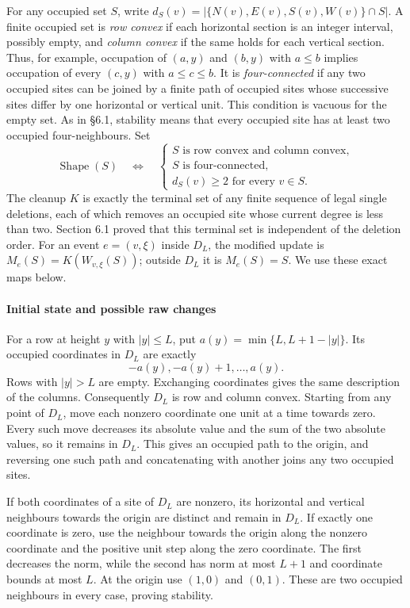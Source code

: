 \documentclass[
  11pt,
  a4paper,
]{article}
\begin{document}
For any occupied set \(S\), write
\(d_S(v)=|\{N(v),E(v),S(v),W(v)\}\cap S|\). A finite occupied set is
\emph{row convex} if each horizontal section is an integer interval,
possibly empty, and \emph{column convex} if the same holds for each
vertical section. Thus, for example, occupation of \((a,y)\) and
\((b,y)\) with \(a\le b\) implies occupation of every \((c,y)\) with
\(a\le c\le b\). It is \emph{four-connected} if any two occupied sites
can be joined by a finite path of occupied sites whose successive sites
differ by one horizontal or vertical unit. This condition is vacuous for
the empty set. As in §6.1, stability means that every occupied site has
at least two occupied four-neighbours. Set \[
\operatorname{Shape}(S)
\quad\Longleftrightarrow\quad
\left\{\begin{array}{l}
S\text{ is row convex and column convex},\\
S\text{ is four-connected},\\
d_S(v)\ge2\text{ for every }v\in S.
\end{array}\right.
\tag{G1}
\] The cleanup \(K\) is exactly the terminal set of any finite sequence
of legal single deletions, each of which removes an occupied site whose
current degree is less than two. Section 6.1 proved that this terminal
set is independent of the deletion order. For an event \(e=(v,\xi)\)
inside \(D_L\), the modified update is \(M_e(S)=K(W_{v,\xi}(S))\);
outside \(D_L\) it is \(M_e(S)=S\). We use these exact maps below.

\paragraph{Initial state and possible raw
changes}\label{initial-state-and-possible-raw-changes}

For a row at height \(y\) with \(|y|\le L\), put
\(a(y)=\min\{L,L+1-|y|\}\). Its occupied coordinates in \(D_L\) are
exactly \[
-a(y),-a(y)+1,\ldots,a(y).
\] Rows with \(|y|>L\) are empty. Exchanging coordinates gives the same
description of the columns. Consequently \(D_L\) is row and column
convex. Starting from any point of \(D_L\), move each nonzero coordinate
one unit at a time towards zero. Every such move decreases its absolute
value and the sum of the two absolute values, so it remains in \(D_L\).
This gives an occupied path to the origin, and reversing one such path
and concatenating with another joins any two occupied sites.

If both coordinates of a site of \(D_L\) are nonzero, its horizontal and
vertical neighbours towards the origin are distinct and remain in
\(D_L\). If exactly one coordinate is zero, use the neighbour towards
the origin along the nonzero coordinate and the positive unit step along
the zero coordinate. The first decreases the norm, while the second has
norm at most \(L+1\) and coordinate bounds at most \(L\). At the origin
use \((1,0)\) and \((0,1)\). These are two occupied neighbours in every
case, proving stability.
\end{document}
